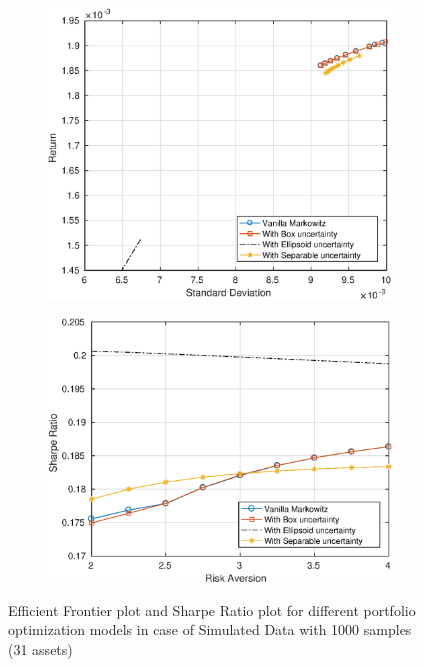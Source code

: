 \documentclass[12pt]{article}
\numberwithin{equation}{section}
\begin{document}
\begin{figure}[h]
\centering
\begin{subfigure}{.5\textwidth}
  \centering
  \includegraphics[width=.8\linewidth]{30_ef_ideal_range_1000_sim.eps}
\end{subfigure}%
\begin{subfigure}{.5\textwidth}
  \centering
  \includegraphics[width=.8\linewidth]{30_sr_ideal_range_1000_sim.eps}
\end{subfigure}
\caption{Efficient Frontier plot and Sharpe Ratio plot for different portfolio optimization models in case of Simulated Data with 1000 samples (31 assets)}
\label{fig:1}
\end{figure}
\end{document}
